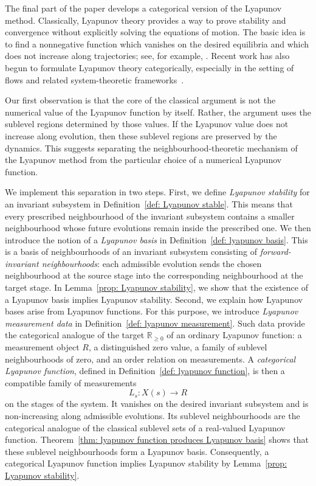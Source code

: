 \documentclass[a4paper,reqno,oneside]{amsart}
\theoremstyle{definition}
\theoremstyle{remark}
\numberwithin{equation}{section}
\begin{document}
\medskip




The final part of the paper develops a categorical version of the Lyapunov
method. Classically, Lyapunov theory provides a way to prove stability and
convergence without explicitly solving the equations of motion. The basic
idea is to find a nonnegative function which vanishes on the desired
equilibria and which does not increase along trajectories;
see, for example, \cite[Ch.~4]{Kh02}. Recent work has also begun to formulate
Lyapunov theory categorically, especially in the setting of flows and related
system-theoretic frameworks~\cite{AMT25,AMM25}.


Our first observation is that the core of the classical argument is not the
numerical value of the Lyapunov function by itself. Rather, the argument uses
the sublevel regions determined by those values. If the Lyapunov value does
not increase along evolution, then these sublevel regions are preserved by
the dynamics. This suggests separating the neighbourhood-theoretic mechanism
of the Lyapunov method from the particular choice of a numerical Lyapunov
function.

We implement this separation in two steps. First, we define
\textit{Lyapunov stability} for an invariant subsystem in
Definition~\ref{def: Lyapunov stable}. This means that every prescribed
neighbourhood of the invariant subsystem contains a smaller neighbourhood
whose future evolutions remain inside the prescribed one. We then introduce
the notion of a \textit{Lyapunov basis} in
Definition~\ref{def: lyapunov basis}. This is a basis of neighbourhoods of an
invariant subsystem consisting of \textit{forward-invariant neighbourhoods}:
each admissible evolution sends the chosen neighbourhood at the source stage
into the corresponding neighbourhood at the target stage. In Lemma~\ref{prop: Lyapunov stability}, we show that the existence of a Lyapunov basis implies Lyapunov
stability. Second, we explain how Lyapunov bases arise from Lyapunov functions. For this
purpose, we introduce \textit{Lyapunov measurement data} in
Definition~\ref{def: lyapunov measurement}. Such data provide the categorical
analogue of the target $\mathbb R_{\geq 0}$ of an ordinary Lyapunov function:
a measurement object $R$, a distinguished zero value, a family of sublevel
neighbourhoods of zero, and an order relation on measurements. A
\textit{categorical Lyapunov function}, defined in
Definition~\ref{def: lyapunov function}, is then a compatible family of
measurements
\begin{equation}
    L_s\colon X(s)\to R
\end{equation}
on the stages of the system. It vanishes on the desired invariant subsystem and is
non-increasing along admissible evolutions. Its sublevel neighbourhoods are the categorical analogue of the classical sublevel sets of a real-valued
Lyapunov function. Theorem~\ref{thm: lyapunov function produces Lyapunov basis}
shows that these sublevel neighbourhoods form a Lyapunov basis. Consequently,
a categorical Lyapunov function implies Lyapunov stability by
Lemma~\ref{prop: Lyapunov stability}.
\end{document}

